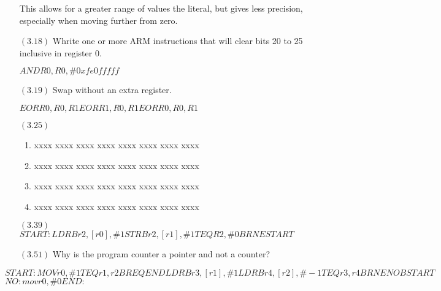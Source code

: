 \documentclass[letterpaper,10pt,titlepage]{article}
\begin{document}
\begin{enumerate}
This allows for a greater range of values the literal, but gives less precision, especially when moving further from zero.
\item[$(3.18)$] Whrite one or more ARM instructions that will clear bits 20 to 25 inclusive in register 0.

$AND R0, R0, \#0xfe0fffff$
\item[$(3.19)$]Swap without an extra register.

$EOR R0, R0, R1
EOR R1, R0, R1
EOR R0, R0, R1$
\item[$(3.25)$]

\begin{enumerate}
\item xxxx xxxx xxxx xxxx xxxx xxxx xxxx xxxx
\item xxxx xxxx xxxx xxxx xxxx xxxx xxxx xxxx
\item xxxx xxxx xxxx xxxx xxxx xxxx xxxx xxxx
\item xxxx xxxx xxxx xxxx xxxx xxxx xxxx xxxx
\end{enumerate}
\item[$(3.39)$]
$START:
LDRB r2, [r0],\#1
STRB r2, [r1],\#1
TEQ R2, \#0
BRNE START
$
\item[$(3.51)$]Why is the program counter a pointer and not a counter?	 
\end{enumerate}
$START:
MOV r0, \#1
TEQ r1, r2
BREQ END
LDRB r3, [r1], \#1
LDRB r4, [r2], \#-1
TEQ r3, r4
BRNE NO
B START$
$
NO:
mov r0, \#0
END:
$
\end{document}
